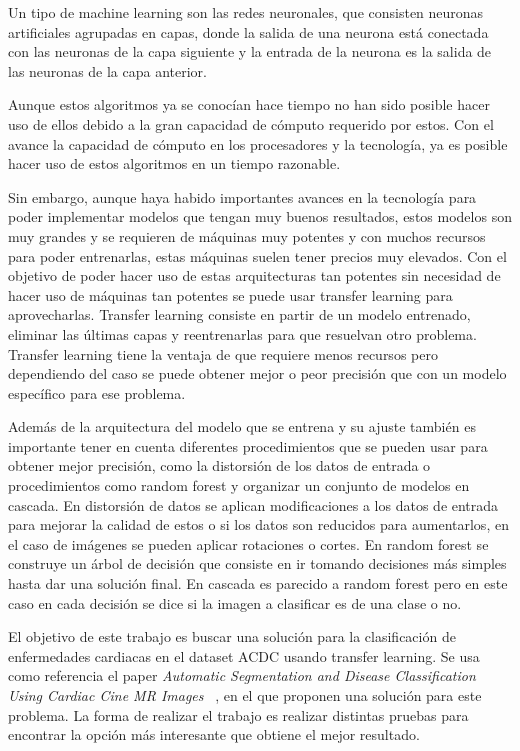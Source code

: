 \documentclass[12pt,a4paper]{article}
\begin{document}
Un tipo de machine learning son las redes neuronales, que consisten neuronas artificiales agrupadas en capas, donde la salida de una neurona está conectada con las neuronas de la capa siguiente y la entrada de la neurona es la salida de las neuronas de la capa anterior.
\bigskip

Aunque estos algoritmos ya se conocían hace tiempo no han sido posible hacer uso de ellos debido a la gran capacidad de cómputo requerido por estos. Con el avance la capacidad de cómputo en los procesadores y la tecnología, ya es posible hacer uso de estos algoritmos en un tiempo razonable.
\bigskip

Sin embargo, aunque haya habido importantes avances en la tecnología para poder implementar modelos que tengan muy buenos resultados, estos modelos son muy grandes y se requieren de máquinas muy potentes y con muchos recursos para poder entrenarlas, estas máquinas suelen tener precios muy elevados. Con el objetivo de poder hacer uso de estas arquitecturas tan potentes sin necesidad de hacer uso de máquinas tan potentes se puede usar transfer learning para aprovecharlas. Transfer learning consiste en partir de un modelo entrenado, eliminar las últimas capas y reentrenarlas para que resuelvan otro problema. Transfer learning tiene la ventaja de que requiere menos recursos pero dependiendo del caso se puede obtener mejor o peor precisión que con un modelo específico para ese problema. 
\bigskip

Además de la arquitectura del modelo que se entrena y su ajuste también es importante tener en cuenta diferentes procedimientos que se pueden usar para obtener mejor precisión, como la distorsión de los datos de entrada o procedimientos como random forest y organizar un conjunto de modelos en cascada. En distorsión de datos se aplican modificaciones a los datos de entrada para mejorar la calidad de estos o si los datos son reducidos para aumentarlos, en el caso de imágenes se pueden aplicar rotaciones o cortes. En random forest se construye un árbol de decisión que consiste en ir tomando decisiones más simples hasta dar una solución final. En cascada es parecido a random forest pero en este caso en cada decisión se dice si la imagen a clasificar es de una clase o no.
\bigskip

El objetivo de este trabajo es buscar una solución para la clasificación de enfermedades cardiacas en el dataset ACDC usando transfer learning. Se usa como referencia el paper  \textit{Automatic Segmentation and Disease Classification Using Cardiac Cine MR Images} ~\cite{DBLP:journals/corr/abs-1708-01141}, en el que proponen una solución para este problema. La forma de realizar el trabajo es realizar distintas pruebas para encontrar la opción más interesante que obtiene el mejor resultado.
\bigskip
\end{document}

